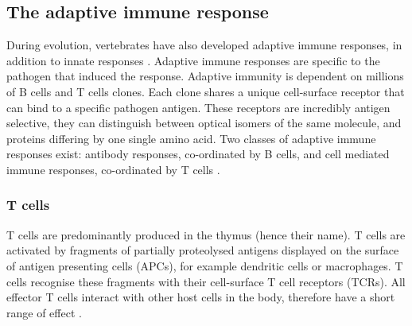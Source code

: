 \subsection{The adaptive immune response}
During evolution, vertebrates have also developed adaptive immune responses, in addition to innate responses \cite{hoffmann2013innate}.
Adaptive immune responses are specific to the pathogen that induced the response.
Adaptive immunity is dependent on millions of B cells and T cells clones.
Each clone shares a unique cell-surface receptor that can bind to a specific pathogen antigen.
These receptors are incredibly antigen selective, they can distinguish between optical isomers of the same molecule, and proteins differing by one single amino acid.
Two classes of adaptive immune responses exist: antibody responses, co-ordinated by B cells, and cell mediated immune responses, co-ordinated by T cells \cite{alberts2007molecularimmune}.
%
\subsubsection{T cells}
T cells are predominantly produced in the thymus (hence their name).
T cells are activated by fragments of partially proteolysed antigens displayed on the surface of antigen presenting cells (APCs), for example dendritic cells or macrophages.
T cells recognise these fragments with their cell-surface T cell receptors (TCRs)\@.
All effector T cells interact with other host cells in the body, therefore have a short range of effect \cite{alberts2007molecularimmune}.

